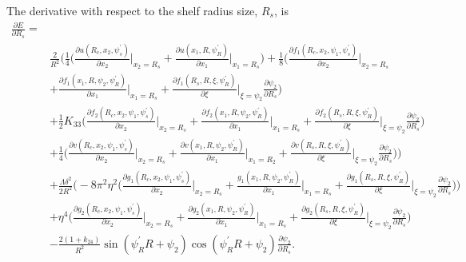 \documentclass[12pt]{article}
\begin{document}
The derivative with respect to the shelf radius size, $R_s$, is
\begin{align}
\frac{\partial E}{\partial R_s}=&\nonumber\\
&\frac{2}{R^2}\bigg(\frac{1}{4}\bigg(\frac{\partial u(R_c,x_2,\psi_s^{\prime})}{\partial x_2}\bigg|_{x_2=R_s}+\frac{\partial u(x_1,R,\psi_R^{\prime})}{\partial x_1}\bigg|_{x_1=R_s}\bigg)+\frac{1}{8}\bigg(\frac{\partial f_1(R_c,x_2,\psi_1,\psi_s^{\prime})}{\partial x_2}\bigg|_{x_2=R_s}\nonumber\\
&+\frac{\partial f_1(x_1,R,\psi_2,\psi_R^{\prime})}{\partial x_1}\bigg|_{x_1=R_s}+\frac{\partial f_1(R_s,R,\xi,\psi_R^{\prime})}{\partial\xi}\bigg|_{\xi=\psi_2}\frac{\partial\psi_2}{\partial R_s}\bigg)\nonumber\\
&+\frac{1}{2}K_{33}\bigg(\frac{\partial f_2(R_c,x_2,\psi_1,\psi_s^{\prime})}{\partial x_2}\bigg|_{x_2=R_s}+\frac{\partial f_2(x_1,R,\psi_2,\psi_R^{\prime})}{\partial x_1}\bigg|_{x_1=R_s}+\frac{\partial f_2(R_s,R,\xi,\psi_R^{\prime})}{\partial\xi}\bigg|_{\xi=\psi_2}\frac{\partial\psi_2}{\partial R_s}\bigg)\nonumber\\
&+\frac{1}{4}\bigg(\frac{\partial v(R_c,x_2,\psi_1,\psi_s^{\prime})}{\partial x_2}\bigg|_{x_2=R_s}+\frac{\partial v(x_1,R,\psi_2,\psi_R^{\prime})}{\partial x_1}\bigg|_{x_1=R_2}+\frac{\partial v(R_s,R,\xi,\psi_R^{\prime})}{\partial\xi}\bigg|_{\xi=\psi_2}\frac{\partial\psi_2}{\partial R_s}\bigg)\bigg)\nonumber\\
&+\frac{\Lambda\delta^2}{2R^2}\bigg(-8\pi^2\eta^2\bigg(\frac{\partial g_1(R_c,x_2,\psi_1,\psi_s^{\prime})}{\partial x_2}\bigg|_{x_2=R_s}+\frac{g_1(x_1,R,\psi_2,\psi_R^{\prime})}{\partial x_1}\bigg|_{x_1=R_s}+\frac{\partial g_1(R_s,R,\xi,\psi_R^{\prime})}{\partial \xi}\bigg|_{\xi=\psi_2}\frac{\partial\psi_2}{\partial R_s}\bigg)\bigg)\nonumber\\
&+\eta^4\bigg(\frac{\partial g_2(R_c,x_2,\psi_1,\psi_s^{\prime})}{\partial x_2}\bigg|_{x_2=R_s}+\frac{\partial g_2(x_1,R,\psi_2,\psi_R^{\prime})}{\partial x_1}\bigg|_{x_1=R_s}+\frac{\partial g_2(R_s,R,\xi,\psi_R^{\prime})}{\partial\xi}\bigg|_{\xi=\psi_2}\frac{\partial \psi_2}{\partial R_s}\bigg)\nonumber\\
&-\frac{2(1+k_{24})}{R^2}\sin(\psi_R^{\prime}R+\psi_2)\cos(\psi_R^{\prime}R+\psi_2)\frac{\partial\psi_2}{\partial R_s}.\label{eq:dEdRs}
\end{align}
\end{document}

